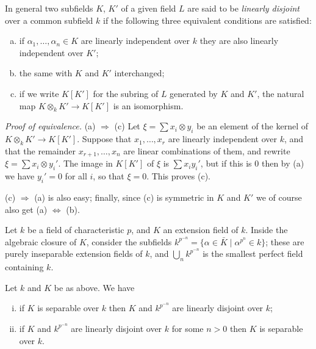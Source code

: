 In general two subfields $K$, $K'$ of a given field $L$ are said to be \emph{linearly
disjoint} over a common subfield $k$ if the following three equivalent
conditions are satisfied:
\begin{enumerate}[(a)]
  \item if $\alpha_1, \ldots, \alpha_n \in K$ are linearly independent over $k$ they are also
        linearly independent over $K'$;
  \item the same with $K$ and $K'$ interchanged;
  \item if we write $K[K']$ for the subring of $L$ generated by $K$ and $K'$, the
        natural map $K \otimes_k K' \to K[K']$ is an isomorphism.
\end{enumerate}

\textit{Proof of equivalence.} (a) $\Rightarrow$ (c) Let $\xi = \sum x_i \otimes y_i$ be an element of
the kernel of $K \otimes_k K' \to K[K']$. Suppose that $x_1, \ldots, x_r$ are linearly
independent over $k$, and that the remainder $x_{r+1}, \ldots, x_n$ are linear
combinations of them, and rewrite $\xi = \sum x_i \otimes y_i'$. The image in $K[K']$ of
$\xi$ is $\sum x_iy_i'$, but if this is $0$ then by (a) we have $y_i' = 0$ for all $i$, so that
$\xi = 0$. This proves (c).

(c) $\Rightarrow$ (a) is also easy; finally, since (c) is symmetric in $K$ and $K'$ we of
course also get (a) $\Leftrightarrow$ (b).

Let $k$ be a field of characteristic $p$, and $K$ an extension field of $k$. Inside
the algebraic closure of $K$, consider the subfields $k^{p^{-n}} =
\{\alpha \in \bar{K} \mid \alpha^{p^n} \in k\}$; these are purely inseparable extension fields of
$k$, and $\bigcup_n k^{p^{-n}}$ is the smallest perfect field containing $k$.

\begin{theorem}[S.~MacLane]\label{thm:26.4}
Let $k$ and $K$ be as above. We have
\begin{enumerate}[(i)]
  \item if $K$ is separable over $k$ then $K$ and $k^{p^{-n}}$ are linearly disjoint over $k$;
  \item if $K$ and $k^{p^{-n}}$ are linearly disjoint over $k$ for some $n > 0$ then $K$ is
        separable over $k$.
\end{enumerate}
\end{theorem}

